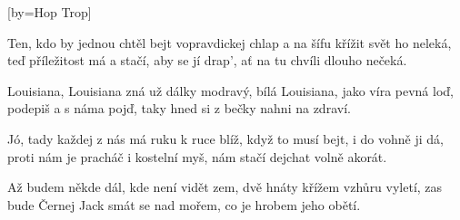 [by={Hop Trop}]

\beginverse{}
Ten, kdo by jednou chtěl bejt vopravdickej chlap
a na šífu křížit svět ho neleká,
teď příležitost má a stačí, aby se jí drap',
ať na tu chvíli dlouho nečeká.
\endverse{}

\beginchorus{}
Louisiana, Louisiana zná už dálky modravý,
bílá Louisiana, jako víra pevná loď,
podepiš a s náma pojď, taky hned si z bečky nahni na zdraví.
\endchorus{}

\beginverse{}
Jó, tady každej z nás má ruku k ruce blíž,
když to musí bejt, i do vohně ji dá,
proti nám je pracháč i kostelní myš,
nám stačí dejchat volně akorát.
\endverse{}

\beginchorus{}
\phantom{}
\endchorus{}

\beginverse{}
Až budem někde dál, kde není vidět zem,
dvě hnáty křížem vzhůru vyletí,
zas bude Černej Jack smát se nad mořem,
co je hrobem jeho obětí.
\endverse{}

\beginchorus{}
\phantom{}
\endchorus{}

\endsong{}
